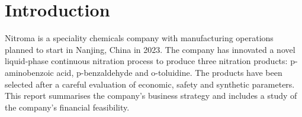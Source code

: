 \section{Introduction}
Nitroma is a speciality chemicals company with manufacturing operations planned to start in Nanjing, China in 2023. The company has innovated a novel liquid-phase continuous nitration process to produce three nitration products: p-aminobenzoic acid, p-benzaldehyde and o-toluidine. The products have been selected after a careful evaluation of economic, safety and synthetic parameters. This report summarises the company’s business strategy and includes a study of the company’s financial feasibility.  